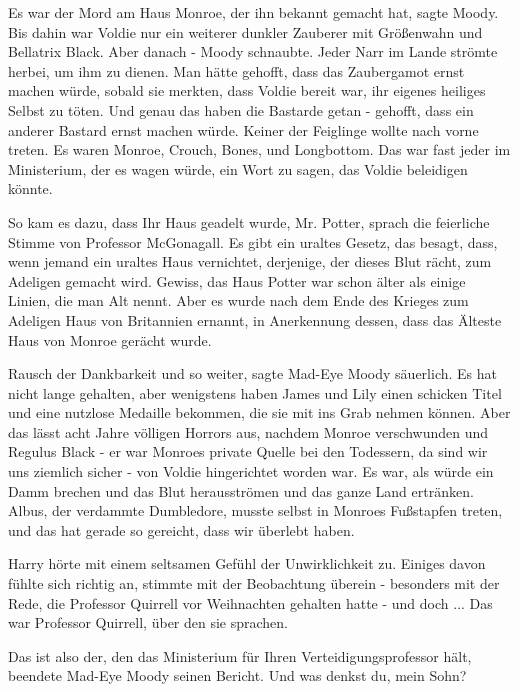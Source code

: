 \glqq{}Es war der Mord am Haus Monroe, der ihn bekannt gemacht hat\grqq{}, sagte
Moody. \glqq{}Bis dahin war Voldie nur ein weiterer dunkler Zauberer mit
Größenwahn und Bellatrix Black. Aber danach -\grqq{} Moody schnaubte. \glqq{}
Jeder Narr im Lande strömte herbei, um ihm zu dienen. Man hätte gehofft, dass
das Zaubergamot ernst machen würde, sobald sie merkten, dass Voldie bereit war,
ihr eigenes heiliges Selbst zu töten. Und genau das haben die Bastarde getan -
gehofft, dass ein anderer Bastard ernst machen würde. Keiner der Feiglinge
wollte nach vorne treten. Es waren Monroe, Crouch, Bones, und Longbottom. Das
war fast jeder im Ministerium, der es wagen würde, ein Wort zu sagen, das Voldie
beleidigen könnte.\grqq{}

\glqq{}So kam es dazu, dass Ihr Haus geadelt wurde, Mr. Potter\grqq{}, sprach die
feierliche Stimme von Professor McGonagall. \glqq{}Es gibt ein uraltes Gesetz,
das besagt, dass, wenn jemand ein uraltes Haus vernichtet, derjenige, der dieses
Blut rächt, zum Adeligen gemacht wird. Gewiss, das Haus Potter war schon älter
als einige Linien, die man Alt nennt. Aber es wurde nach dem Ende des Krieges
zum Adeligen Haus von Britannien ernannt, in Anerkennung dessen, dass das
Älteste Haus von Monroe gerächt wurde.\grqq{}

\glqq{}Rausch der Dankbarkeit und so weiter\grqq{}, sagte Mad-Eye Moody
säuerlich. \glqq{}Es hat nicht lange gehalten, aber wenigstens haben James und
Lily einen schicken Titel und eine nutzlose Medaille bekommen, die sie mit ins
Grab nehmen können. Aber das lässt acht Jahre völligen Horrors aus, nachdem
Monroe verschwunden und Regulus Black - er war Monroes private Quelle bei den
Todessern, da sind wir uns ziemlich sicher - von Voldie hingerichtet worden war.
Es war, als würde ein Damm brechen und das Blut herausströmen und das ganze Land
ertränken. Albus, der verdammte Dumbledore, musste selbst in Monroes Fußstapfen
treten, und das hat gerade so gereicht, dass wir überlebt haben.\grqq{}

Harry hörte mit einem seltsamen Gefühl der Unwirklichkeit zu. Einiges davon
fühlte sich richtig an, stimmte mit der Beobachtung überein - besonders mit der
Rede, die Professor Quirrell vor Weihnachten gehalten hatte - und doch ... Das
war Professor Quirrell, über den sie sprachen.

\glqq{}Das ist also der, den das Ministerium für Ihren Verteidigungsprofessor
hält\grqq{}, beendete Mad-Eye Moody seinen Bericht. \glqq{}Und was denkst du,
mein Sohn?\grqq{}

